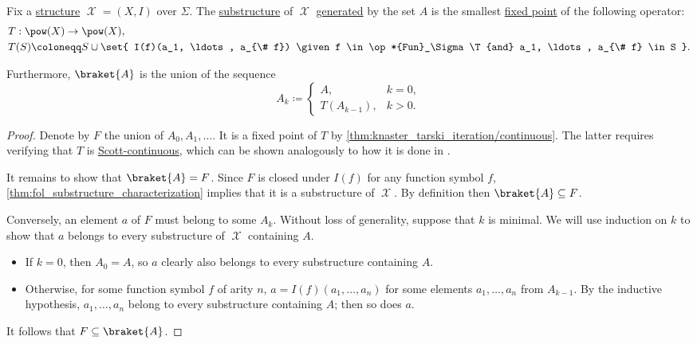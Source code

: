 \begin{proposition}\label{thm:fol_generated_substructure_iteration}
  Fix a \hyperref[def:fol_structure]{structure} \( \mscrX = (X, I) \) over \( \Sigma \). The \hyperref[def:fol_substructure]{substructure} of \( \mscrX \) \hyperref[def:fol_generated_substructure]{generated} by the set \( A \) is the smallest \hyperref[def:function_fixed_point]{fixed point} of the following operator:
  \begin{equation}\label{eq:thm:fol_generated_substructure_iteration/operator}
    \begin{aligned}
      &T: \pow(X) \to \pow(X), \\
      &T(S) \coloneqq S \cup \set{ I(f)(a_1, \ldots, a_{\# f}) \given f \in \op*{Fun}_\Sigma \T{and} a_1, \ldots, a_{\# f} \in S }.
    \end{aligned}
  \end{equation}

  Furthermore, \( \braket{ A } \) is the union of the sequence
  \begin{equation}\label{eq:thm:fol_generated_substructure_iteration/sequence}
    A_k \coloneqq \begin{cases}
      A,          &k = 0, \\
      T(A_{k-1}), &k > 0.
    \end{cases}
  \end{equation}
\end{proposition}
\begin{proof}
  Denote by \( F \) the union of \( A_0, A_1, \ldots \). It is a fixed point of \( T \) by \cref{thm:knaster_tarski_iteration/continuous}. The latter requires verifying that \( T \) is \hyperref[def:scott_continuity]{Scott-continuous}, which can be shown analogously to how it is done in .

  It remains to show that \( \braket{ A } = F \). Since \( F \) is closed under \( I(f) \) for any function symbol \( f \), \cref{thm:fol_substructure_characterization} implies that it is a substructure of \( \mscrX \). By definition then \( \braket{ A } \subseteq F \).

  Conversely, an element \( a \) of \( F \) must belong to some \( A_k \). Without loss of generality, suppose that \( k \) is minimal. We will use induction on \( k \) to show that \( a \) belongs to every substructure of \( \mscrX \) containing \( A \).
  \begin{itemize}
    \item If \( k = 0 \), then \( A_0 = A \), so \( a \) clearly also belongs to every substructure containing \( A \).

    \item Otherwise, for some function symbol \( f \) of arity \( n \), \( a = I(f)(a_1, \ldots, a_n) \) for some elements \( a_1, \ldots, a_n \) from \( A_{k-1} \). By the inductive hypothesis, \( a_1, \ldots, a_n \) belong to every substructure containing \( A \); then so does \( a \).
  \end{itemize}

  It follows that \( F \subseteq \braket{ A } \).
\end{proof}

